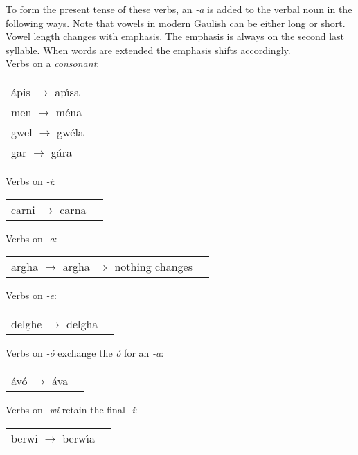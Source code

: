 To form the present tense of these verbs, an \textit{-a} is added to the verbal noun in the following ways. Note that vowels in modern Gaulish can be either long or short. Vowel length changes with emphasis. The emphasis is always on the second last syllable. When words are extended the emphasis shifts accordingly.\\

Verbs on a \textit{consonant}:
\begin{table}[H]
\begin{tabular}{l}
  \'{a}pis $\rightarrow$ ap\'{\i}sa\\
  men $\rightarrow$ m\'{e}na\\
  gwel $\rightarrow$ gw\'{e}la\\
  gar $\rightarrow$ g\'{a}ra\\
\end{tabular}
\label{example_verbs_oac}
\end{table}

Verbs on \textit{-i}:
\begin{table}[H]
\begin{tabular}{ll}
  carni $\rightarrow$ carna
\end{tabular}
\label{example_verbs_on_i}
\end{table}

Verbs on \textit{-a}:
\begin{table}[H]
\begin{tabular}{ll}
  argha $\rightarrow$ argha $\Rightarrow$ nothing changes
\end{tabular}
\label{example_verbs_on_a}
\end{table}

Verbs on \textit{-e}:
\begin{table}[H]
\begin{tabular}{ll}
  delghe $\rightarrow$ delgha
\end{tabular}
\label{example_verbs_on_e}
\end{table}

Verbs on \textit{-\'{o}} exchange the \textit{\'{o}} for an \textit{-a}:
\begin{table}[H]
\begin{tabular}{ll}
  \'{a}v\'{o} $\rightarrow$ \'{a}va
\end{tabular}
\label{example_verbs_on_oo}
\end{table}

Verbs on \textit{-wi} retain the final \textit{-i}:
\begin{table}[H]
\begin{tabular}{ll}
  berwi $\rightarrow$ berw\'{\i}a
\end{tabular}
\label{example_verbs_on_wi}
\end{table}

